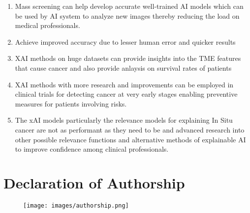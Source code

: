 \documentclass[sigconf, language=english]{acmart}
\begin{document}
\begin{enumerate}
\item Mass screening can help develop accurate well-trained AI models which can be used by AI system to analyze new images thereby reducing the load on medical professionals. 
\item Achieve improved accuracy due to lesser human error and quicker results
\item XAI methods on huge datasets can provide insights into the TME features that cause cancer and also provide anlaysis on survival rates of patients
\item XAI methods with more research and improvements can be employed in clinical trials for detecting cancer at very early stages enabling preventive measures for patients involving risks.
\item The xAI models particularly the relevance models for explaining In Situ cancer are not as performant as they need to be and advanced research into other possible relevance functions and alternative methods of explainable AI to improve confidence among clinical professionals.
\end{enumerate}

\clearpage
\section{Declaration of Authorship}

\begin{figure} [ht]
  \texttt{[image: images/authorship.png]}
\end{figure}

\clearpage


\end{document}
